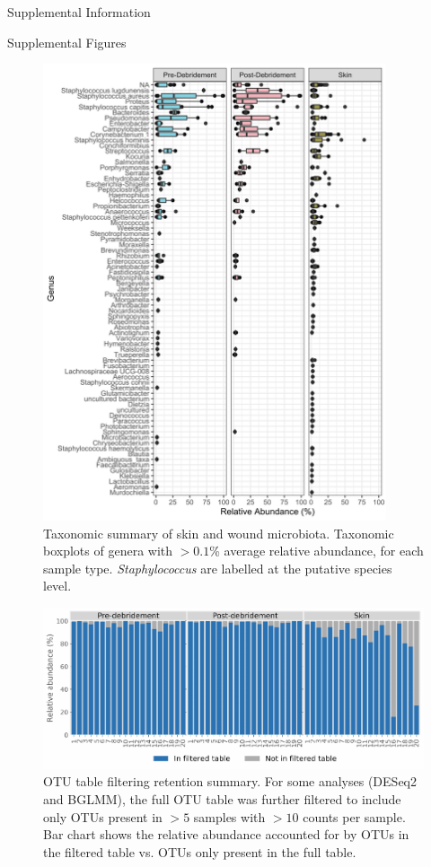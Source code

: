\documentclass[oneside,12pt,final]{sty/ucthesis-CA2012}
\begin{document}
\begin{mainmatter}
\begin{section}{Supplemental Information}
\begin{subsection}{Supplemental Figures}
\begin{figure}[h]
\centering
\centerline{\includegraphics[width=0.9\textwidth]{fig/C3figS5.pdf}}
\caption{Taxonomic summary of skin and wound microbiota. Taxonomic boxplots of genera with $>0.1$\% average relative abundance, for each sample type. \textit{Staphylococcus} are labelled at the putative species level.}
\label{fig:S5}
\end{figure}

\begin{figure}[h]
\centering
\centerline{\includegraphics[width=\textwidth]{fig/C3figS1E.pdf}}
\caption{OTU table filtering retention summary. For some analyses (DESeq2 and BGLMM), the full OTU table was further filtered to include only OTUs present in $>5$ samples with $>10$ counts per sample. Bar chart shows the relative abundance accounted for by OTUs in the filtered table vs. OTUs only present in the full table.}
\label{fig:S1E}
\end{figure}


\end{subsection}
\end{section}
\end{mainmatter}
\end{document}
